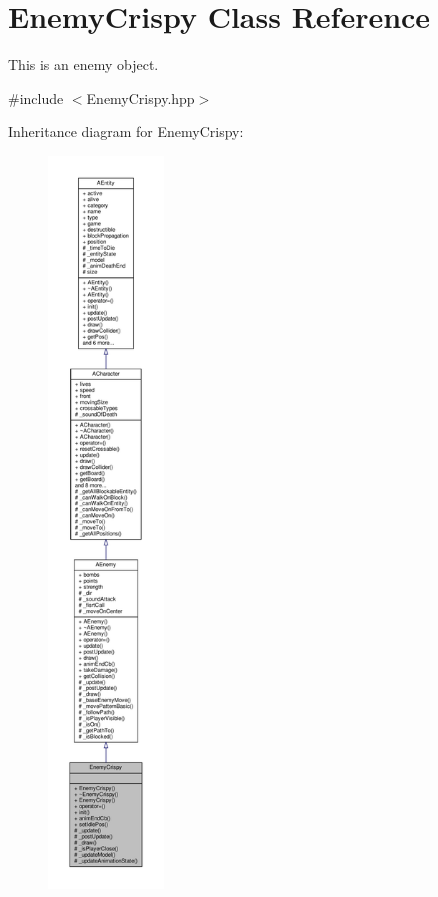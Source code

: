 \hypertarget{class_enemy_crispy}{}\section{Enemy\+Crispy Class Reference}
\label{class_enemy_crispy}


This is an enemy object.  




{\ttfamily \#include $<$Enemy\+Crispy.\+hpp$>$}



Inheritance diagram for Enemy\+Crispy\+:
\nopagebreak
\begin{figure}[H]
\begin{center}
\leavevmode
\includegraphics[height=550pt]{class_enemy_crispy__inherit__graph}
\end{center}
\end{figure}


